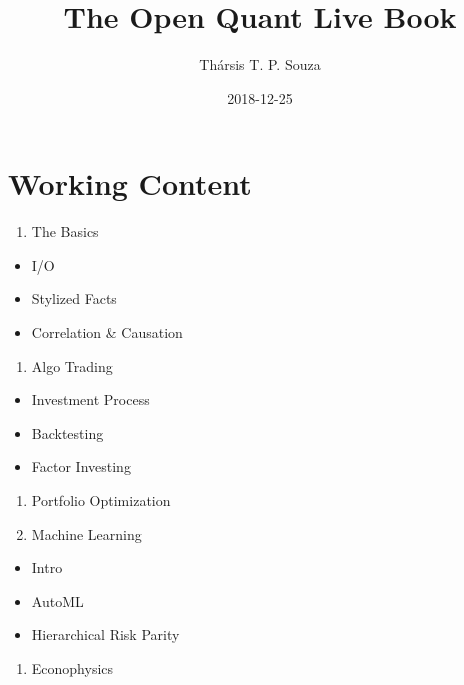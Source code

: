 \documentclass[]{book}
\title{The Open Quant Live Book}
\author{Thársis T. P. Souza}
\date{2018-12-25}
\providecommand{\tightlist}{%
  \setlength{\itemsep}{0pt}\setlength{\parskip}{0pt}}
\begin{document}
\maketitle

{
\setcounter{tocdepth}{1}
\tableofcontents
}
\chapter*{Working Content}\label{working-content}

\begin{enumerate}
\def\labelenumi{\arabic{enumi}.}
\tightlist
\item
  The Basics
\end{enumerate}

\begin{itemize}
\tightlist
\item
  I/O
\item
  Stylized Facts
\item
  Correlation \& Causation
\end{itemize}

\begin{enumerate}
\def\labelenumi{\arabic{enumi}.}
\setcounter{enumi}{1}
\tightlist
\item
  Algo Trading
\end{enumerate}

\begin{itemize}
\tightlist
\item
  Investment Process
\item
  Backtesting
\item
  Factor Investing
\end{itemize}

\begin{enumerate}
\def\labelenumi{\arabic{enumi}.}
\setcounter{enumi}{2}
\item
  Portfolio Optimization
\item
  Machine Learning
\end{enumerate}

\begin{itemize}
\tightlist
\item
  Intro
\item
  AutoML
\item
  Hierarchical Risk Parity
\end{itemize}

\begin{enumerate}
\def\labelenumi{\arabic{enumi}.}
\setcounter{enumi}{4}
\tightlist
\item
  Econophysics
\end{enumerate}
\end{document}
